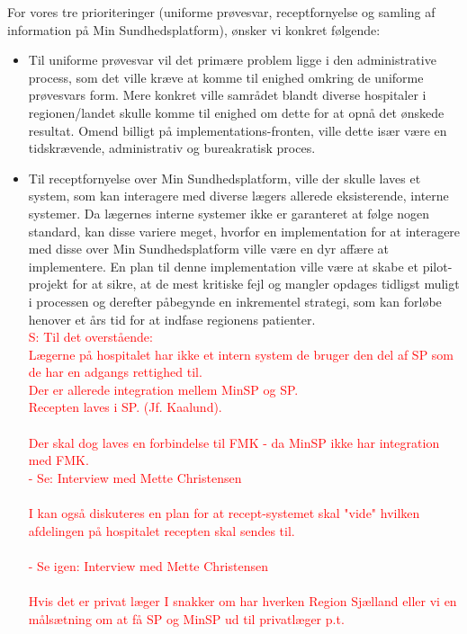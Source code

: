 For vores tre prioriteringer (uniforme prøvesvar, receptfornyelse og samling af information på Min Sundhedsplatform), ønsker vi konkret følgende:
\begin{itemize}
	\item Til uniforme prøvesvar vil det primære problem ligge i den administrative process, som det ville kræve at komme til enighed omkring de uniforme prøvesvars form. Mere konkret ville samrådet blandt diverse hospitaler i regionen/landet skulle komme til enighed om dette for at opnå det ønskede resultat. Omend billigt på implementations-fronten, ville dette især være en tidskrævende, administrativ og bureakratisk proces. 
	\item Til receptfornyelse over Min Sundhedsplatform, ville der skulle laves et system, som kan interagere med diverse lægers allerede eksisterende, interne systemer. Da lægernes interne systemer ikke er garanteret at følge nogen standard, kan disse variere meget, hvorfor en implementation for at interagere med disse over Min Sundhedsplatform ville være en dyr affære at implementere. En plan til denne implementation ville være at skabe et pilot-projekt for at sikre, at de mest kritiske fejl og mangler opdages tidligst muligt i processen og derefter påbegynde en inkrementel strategi, som kan forløbe henover et års tid for at indfase regionens patienter.   
\textcolor{red}{\\
	S: Til det overstående:\\	
	Lægerne på hospitalet har ikke et intern system de bruger den del af SP som de har en adgangs rettighed til. \\
	Der er allerede integration mellem MinSP og SP.\\
	Recepten laves i SP. (Jf. Kaalund).	\\
	\\
	Der skal dog laves en forbindelse til FMK - da MinSP ikke har integration med FMK.\\
	- Se: Interview med Mette Christensen \\
	\\
	I kan også diskuteres en plan for at recept-systemet skal "vide" hvilken afdelingen på hospitalet recepten skal sendes til.\\
	\\
	- Se igen: Interview med Mette Christensen\\
	\\
	Hvis det er privat læger I snakker om har hverken Region Sjælland eller vi en målsætning om at få SP og MinSP ud til privatlæger p.t.\\
}
\end{itemize}
